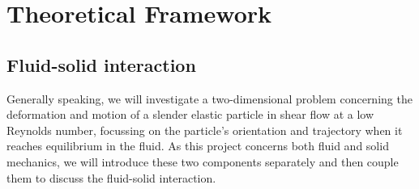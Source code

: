 \documentclass[a4paper,12pt]{report}
\begin{document}
\chapter{Theoretical Framework}

\section{Fluid-solid interaction}
Generally speaking, we will investigate a two-dimensional problem concerning the deformation and motion of a slender elastic particle in shear flow at a low Reynolds number, focussing on the particle's orientation and trajectory when it reaches equilibrium in the fluid. As this project concerns both fluid and solid mechanics, we will introduce these two components separately and then couple them to discuss the fluid-solid interaction.
\end{document}
